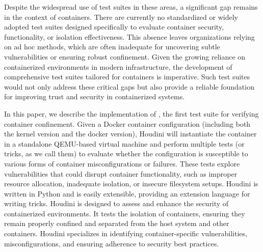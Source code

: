 Despite the widespread use of test suites in these areas, a significant gap remains in the context of containers. There are currently no standardized or widely adopted test suites designed specifically to evaluate container security, functionality, or isolation effectiveness. This absence leaves organizations relying on ad hoc methods, which are often inadequate for uncovering subtle vulnerabilities or ensuring robust confinement. Given the growing reliance on containerized environments in modern infrastructure, the development of comprehensive test suites tailored for containers is imperative. Such test suites would not only address these critical gaps but also provide a reliable foundation for improving trust and security in containerized systems.

In this paper, we describe the implementation of \houdini, the first test suite for verifying container confinement. Given a Docker container configuration (including both the kernel version and the docker version), Houdini will instantiate the container in a standalone QEMU-based virtual machine and perform multiple tests (or tricks, as we call them) to evaluate whether the configuration is susceptible to various forms of container misconfigurations or failures. These tests explore vulnerabilities that could disrupt container functionality, such as improper resource allocation, inadequate isolation, or insecure filesystem setups. Houdini is written in Python and is easily extensible, providing an extension language for writing tricks. Houdini is designed to assess and enhance the security of containerized environments. It tests the isolation of containers, ensuring they remain properly confined and separated from the host system and other containers. Houdini specializes in identifying container-specific vulnerabilities, misconfigurations, and ensuring adherence to security best practices.

